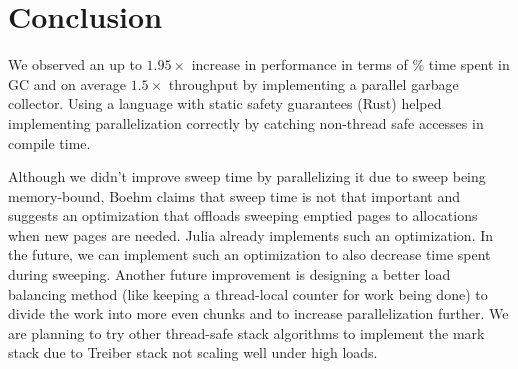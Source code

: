 \section{Conclusion} \label{conclusion}

We observed an up to $1.95\times$ increase in performance in terms of \% time spent in GC and on average $1.5\times$ throughput by implementing a parallel garbage collector.
Using a language with static safety guarantees (Rust) helped implementing parallelization correctly by catching non-thread safe accesses in compile time.

Although we didn't improve sweep time by parallelizing it due to sweep being memory-bound, Boehm\cite{boehm1991mostly} claims that sweep time is not that important and suggests an optimization that offloads sweeping emptied pages to allocations when new pages are needed.
Julia already implements such an optimization.
In the future, we can implement such an optimization to also decrease time spent during sweeping.
Another future improvement is designing a better load balancing method (like keeping a thread-local counter for work being done) to divide the work into more even chunks and to increase parallelization further.
We are planning to try other thread-safe stack algorithms to implement the mark stack due to Treiber stack not scaling well under high loads.


